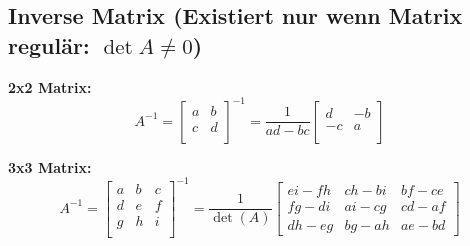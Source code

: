 	
\subsection{Inverse Matrix \small{(Existiert nur wenn Matrix regulär: $\det A \neq 0$)}}
\begin{minipage}{7cm}
	\textbf{2x2 Matrix:}    
	$$ A^{-1} = \begin{bmatrix} a & b \\ c & d \\ \end{bmatrix}^{-1} = \frac{1}{ad
	- bc} \begin{bmatrix} d & -b \\ -c & a \\ \end{bmatrix} $$
\end{minipage}
\begin{minipage}{11cm}
	\textbf{3x3 Matrix:}
  $$  A^{-1} = \begin{bmatrix} a & b & c\\ d & e & f \\ g & h & i \\ \end{bmatrix}^{-1} =
  \frac{1}{\det(A)} \begin{bmatrix} ei - fh & ch - bi & bf - ce \\ fg - di & ai
  - cg & cd - af \\ dh - eg & bg - ah & ae - bd \end{bmatrix} $$
\end{minipage}\\

